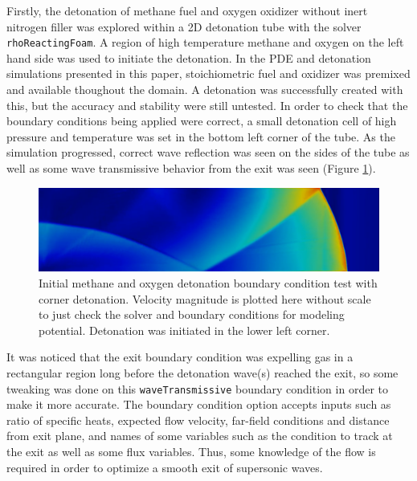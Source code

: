 Firstly, the detonation of methane fuel and oxygen oxidizer without inert nitrogen filler was explored within a 2D detonation tube with the solver \verb|rhoReactingFoam|. A region of high temperature methane and oxygen on the left hand side was used to initiate the detonation. In the PDE and detonation simulations presented in this paper, stoichiometric fuel and oxidizer was premixed and available thoughout the domain. 
A detonation was successfully created with this, but the accuracy and stability were still untested. In order to check that the boundary conditions being applied were correct, a small detonation cell of high pressure and temperature was set in the bottom left corner of the tube. As the simulation progressed, correct wave reflection was seen on the sides of the tube as well as some wave transmissive behavior from the exit was seen (Figure \ref{fig:cornerdet}). 
\begin{figure}[t!]
\centering
\includegraphics[width=\linewidth]{figs/cornerdet.png}
\caption{Initial methane and oxygen detonation boundary condition test with corner detonation. Velocity magnitude is plotted here without scale to just check the solver and boundary conditions for modeling potential. Detonation was initiated in the lower left corner.}
\label{fig:cornerdet}
\end{figure}%
\noindent It was noticed that the exit boundary condition was expelling gas in a rectangular region long before the detonation wave(s) reached the exit, so some tweaking was done on this \verb|waveTransmissive| boundary condition in order to make it more accurate. The boundary condition option accepts inputs such as ratio of specific heats, expected flow velocity, far-field conditions and distance from exit plane, and names of some variables such as the condition to track at the exit as well as some flux variables. Thus, some knowledge of the flow is required in order to optimize a smooth exit of supersonic waves. 

